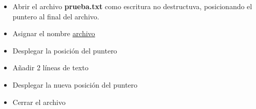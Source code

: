 
\question 
\begin{itemize}
  \item Abrir el archivo \textbf{prueba.txt} como escritura no destructuva,
        posicionando el puntero al final del archivo.
  \item Asignar el nombre \underline{archivo}
  \item Desplegar la posición del puntero
  \item Añadir 2 líneas de texto
  \item Desplegar la nueva posición del puntero
  \item Cerrar el archivo
\end{itemize}
